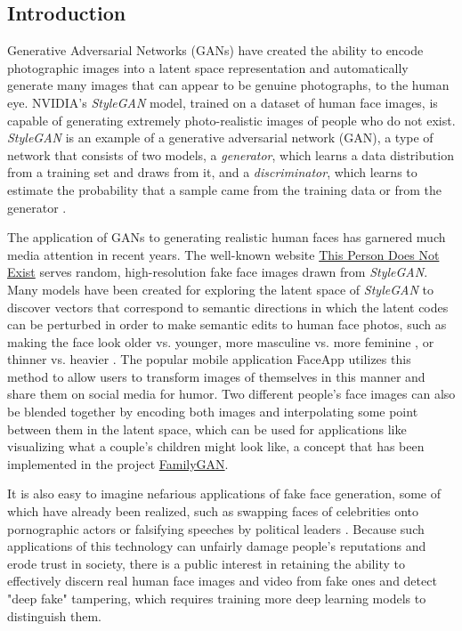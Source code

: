 \documentclass[11pt, letterpaper]{article}
\begin{document}
\begin{multicols}{2}
  \section{Introduction}

  Generative Adversarial Networks (GANs) have created the ability to encode
  photographic images into a latent space representation and automatically
  generate many images that can appear to be genuine photographs, to the human
  eye. NVIDIA's \emph{StyleGAN}\cite{stylegan} model, trained on a dataset of human
  face images, is capable of generating extremely photo-realistic images of
  people who do not exist. \emph{StyleGAN} is an example of a generative adversarial
  network (GAN), a type of network that consists of two models, a
  \emph{generator}, which learns a data distribution from a training set and
  draws from it, and a \emph{discriminator}, which learns to estimate the
  probability that a sample came from the training data or from the generator
  \cite{goodfellow2014generative}.

  The application of GANs to generating realistic human faces has garnered much
  media attention in recent years. The well-known website
  \href{https://thispersondoesnotexist.com/}{This Person Does Not Exist} serves
  random, high-resolution fake face images drawn from \emph{StyleGAN}. Many models have
  been created for exploring the latent space of \emph{StyleGAN} to discover vectors
  that correspond to semantic directions in which the latent codes can be
  perturbed in order to make semantic edits to human face photos, such as making
  the face look older vs. younger, more masculine vs. more feminine
  \cite{shen2020interpreting}, or thinner vs. heavier
  \cite{pinnimty2020transforming}. The popular mobile application FaceApp
  utilizes this method to allow users to transform images of themselves in this
  manner and share them on social media for humor. Two different people's face
  images can also be blended together by encoding both images and interpolating
  some point between them in the latent space, which can be used for applications
  like visualizing what a couple's children might look like, a concept that
  has been implemented in the project
  \href{https://medium.com/swlh/familygan-generating-a-childs-face-using-his-parents-394d8face6a4}{FamilyGAN}.

  It is also easy to imagine nefarious applications of fake face generation,
  some of which have already been realized, such as swapping faces of
  celebrities onto pornographic actors or falsifying speeches by political
  leaders \cite{nguyen2020deep}. Because such applications of this technology
  can unfairly damage people's reputations and erode trust in society, there is
  a public interest in retaining the ability to effectively discern real human
  face images and video from fake ones and detect "deep fake" tampering, which
  requires training more deep learning models to distinguish them.


\end{multicols}
\end{document}
